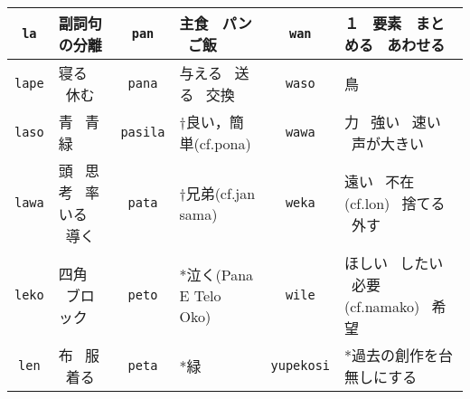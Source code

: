 \documentclass[a4paper,10pt,landscape]{article}
\begin{document}
{\begin{tabular}{|c|l||c|l||c|l|}
\hline \texttt{la} & 副詞句の分離  & \texttt{pan} & 主食  \  パン  \  ご飯  & \texttt{wan} & １  \  要素  \  まとめる  \  あわせる  \\
\hline \texttt{lape} & 寝る \ 休む  & \texttt{pana} & 与える  \  送る  \  交換  & \texttt{waso} & 鳥  \\
\hline \texttt{laso} & 青 \ 青緑  & \texttt{pasila} & †良い，簡単(cf.pona) & \texttt{wawa} & 力  \  強い  \  速い  \  声が大きい  \\
\hline \texttt{lawa} & 頭 \ 思考 \ 率いる \ 導く  & \texttt{pata} & †兄弟(cf.jan sama)  & \texttt{weka} & 遠い  \  不在(cf.lon)  \  捨てる  \  外す  \\
\hline \texttt{leko} & 四角 \ ブロック  & \texttt{peto} & *泣く(Pana E Telo Oko) & \texttt{wile} & ほしい  \  したい  \  必要(cf.namako)  \  希望  \\
\hline \texttt{len} & 布 \ 服 \ 着る  & \texttt{peta} & *緑 & \texttt{yupekosi} & *過去の創作を台無しにする \\
\hline
\end{tabular}
}
\end{document}
